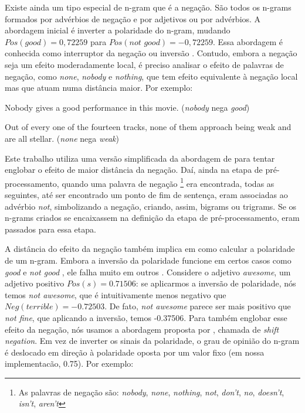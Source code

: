 Existe ainda um tipo especial de n-gram que é a negação. São todos os n-grams formados por advérbios de negação e por adjetivos ou por advérbios. A abordagem inicial é inverter a polaridade do n-gram, mudando $Pos(\textit{good}) = 0,72259$ para $Pos(\textit{not good}) = - 0,72259$. Essa abordagem é conhecida como interruptor da negação ou inversão \cite{sauri2008factuality}. Contudo, embora a negação seja um efeito moderadamente local, é preciso analisar o efeito de palavras de negação, como \textit{none}, \textit{nobody} e \textit{nothing}, que tem efeito equivalente à negação local \cite{taboada2011lexicon} mas que atuam numa distância maior. Por exemplo:

\begin{example}
Nobody gives a good performance in this movie. (\textit{nobody} nega \textit{good})
\label{ex:far_neg_1}
\end{example}

\begin{example}
Out of every one of the fourteen tracks, none of them approach being weak and are all stellar. (\textit{none} nega \textit{weak})
\label{ex:far_neg_2}
\end{example}

Este trabalho utiliza uma versão simplificada da abordagem de \cite{das2001yahoo} para tentar englobar o efeito de maior distância da negação. Daí, ainda na etapa de pré-processamento, quando uma palavra de negação \footnote{As palavras de negação são: \textit{nobody}, \textit{none}, \textit{nothing}, \textit{not}, \textit{don't}, \textit{no}, \textit{doesn't}, \textit{isn't}, \textit{aren't}} era encontrada, todas as seguintes, até ser encontrado um ponto de fim de sentença, eram associadas ao advérbio \textit{not}, simbolizando a negação, criando, assim, bigrams ou trigrams. Se os n-grams criados se encaixassem na definição da etapa de pré-processamento, eram passados para essa etapa. 

A distância do efeito da negação também implica em como calcular a polaridade de um n-gram. Embora a inversão da polaridade funcione em certos casos como \textit{good} e \textit{not good} \cite{choi2008learning}, ele falha muito em outros \cite{liu2009review}. Considere o adjetivo \textit{awesome}, um adjetivo positivo $Pos(s) = 0.71506 $: se aplicarmos a inversão de polaridade, nós temos \textit{not awesome}, que é intuitivamente menos negativo que $Neg(\textit{terrible}) = -0.72503$. De fato, \textit{not awesome} parece ser mais positivo que \textit{not fine}, que aplicando a inversão, temos -0.37506. Para também englobar esse efeito da negação, nós usamos a abordagem proposta por \cite{taboada2011lexicon}, chamada de \textit{shift negation}. Em vez de inverter os sinais da polaridade, o grau de opinião do n-gram é deslocado em direção à polaridade oposta por um valor fixo (em nossa implementacão, 0.75). Por exemplo:


